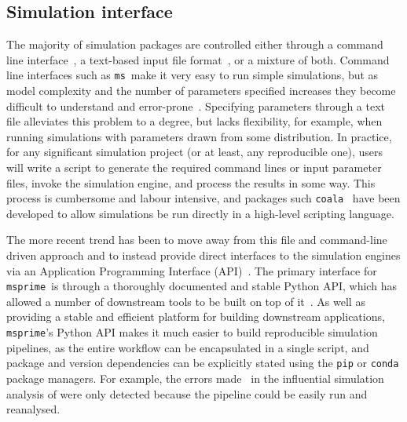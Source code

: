 \documentclass{article}
\newcommand{\msprime}[0]{\texttt{msprime}}
\newcommand{\ms}[0]{\texttt{ms}}
\begin{document}
\subsection*{Simulation interface}
The majority of simulation packages are controlled either through
a command line interface~\citep[e.g.][]{hudson2002generating,kern2016discoal},
a text-based input file
format~\citep[e.g.][]{guillaume2006nemo,excoffier2011fastsimcoal,shlyakhter2014cosi2},
or a mixture of both.
Command line interfaces such as \ms\ make it very easy to run simple
simulations, but as model complexity and the number of parameters specified increases
they become difficult to understand and
error-prone~\citep{ragsdale2020lessons,gower2021demes}.
Specifying parameters through a text file alleviates this problem to a degree,
but lacks flexibility, for example, when running simulations with parameters
drawn from some distribution. In practice, for any significant simulation
project (or at least, any reproducible one), users will write a script
to generate the required command lines or input parameter files,
invoke the simulation engine, and process the results in some way.
This process is cumbersome and labour intensive, and packages
such \texttt{coala}~\citep{staab2016coala} have been developed
to allow simulations be run directly in a high-level
scripting language.

The more recent trend has been to move away from this file and command-line
driven approach and to instead provide direct interfaces to the simulation
engines via an Application Programming Interface (API)~\citep[e.g.][]{
thornton2014cpp,kelleher2016efficient,becheler2019quetzal,haller2019slim}.
The primary interface for \msprime\ is through a thoroughly documented and
stable Python
API, which has allowed a number of downstream tools to be built on top of
it~\citep{terhorst2017robust,chan2018likelihood,spence2019inference,
adrion2020community,adrion2020predicting, kamm2020efficiently,
mckenzie2020ipcoal, montinaro2020revisiting,
de2021geonomics,rivera2021simulation}.
As well as providing a stable and efficient platform for building
downstream applications, \msprime's Python API makes it much easier to
build reproducible simulation pipelines, as the entire workflow can
be encapsulated in a single script, and package and version
dependencies can be explicitly stated using the \texttt{pip}
or \texttt{conda} package managers.
For example, the errors made~\citep{ragsdale2020lessons,martin2020erratum}
in the influential simulation analysis of
\cite{martin2017human} were only detected because the pipeline
could be easily run and reanalysed.
\end{document}
